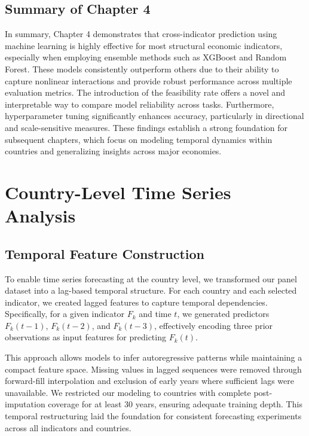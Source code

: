 \documentclass[12pt]{article}
\begin{document}
\subsection*{Summary of Chapter 4}
In summary, Chapter 4 demonstrates that cross-indicator prediction using machine learning is highly effective for most structural economic indicators, especially when employing ensemble methods such as XGBoost and Random Forest. These models consistently outperform others due to their ability to capture nonlinear interactions and provide robust performance across multiple evaluation metrics. The introduction of the feasibility rate offers a novel and interpretable way to compare model reliability across tasks. Furthermore, hyperparameter tuning significantly enhances accuracy, particularly in directional and scale-sensitive measures. These findings establish a strong foundation for subsequent chapters, which focus on modeling temporal dynamics within countries and generalizing insights across major economies.



\section{Country-Level Time Series Analysis}


\subsection{Temporal Feature Construction}

To enable time series forecasting at the country level, we transformed our panel dataset into a lag-based temporal structure. For each country and each selected indicator, we created lagged features to capture temporal dependencies. Specifically, for a given indicator $F_k$ and time $t$, we generated predictors $F_k(t-1)$, $F_k(t-2)$, and $F_k(t-3)$, effectively encoding three prior observations as input features for predicting $F_k(t)$. 

This approach allows models to infer autoregressive patterns while maintaining a compact feature space. Missing values in lagged sequences were removed through forward-fill interpolation and exclusion of early years where sufficient lags were unavailable. We restricted our modeling to countries with complete post-imputation coverage for at least 30 years, ensuring adequate training depth. This temporal restructuring laid the foundation for consistent forecasting experiments across all indicators and countries.
\end{document}
